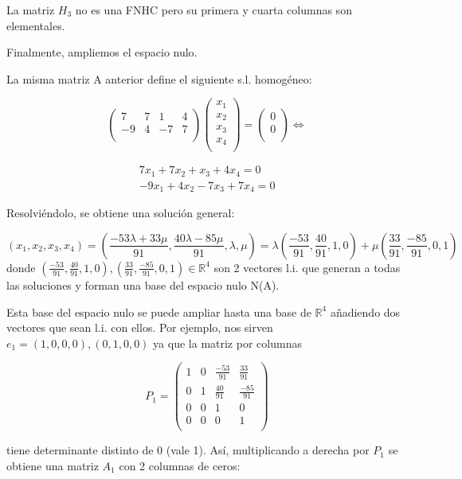 \documentclass[11pt, a4paper]{article}
\newif\IfInSansMode
\newcommand{\R}{\mathbb{R}} \newcommand{\N}{\mathbb{N}}
\theoremstyle{theorem-style}
\theoremstyle{definition-style}
\theoremstyle{remark-style}
\theoremstyle{example-style}
\begin{document}
La matriz $H_3$ no es una FNHC pero su primera y cuarta columnas son elementales.

Finalmente, ampliemos el espacio nulo.

La misma matriz A anterior define el siguiente s.l. homogéneo:

$$ \begin{pmatrix}
7 & 7 & 1 & 4 \\
-9 & 4 & -7 & 7 \\
\end{pmatrix}\begin{pmatrix}
x_1 \\
x_2 \\
x_3 \\
x_4 \\
\end{pmatrix}=
\begin{pmatrix}
0 \\
0 \\
\end{pmatrix} \Leftrightarrow $$

$$\begin{array}{c} 7x_1+7x_2+x_3+4x_4=0 \\ -9x_1+4x_2-7x_3+7x_4=0 \end{array} $$ 

Resolviéndolo, se obtiene una solución general:

$$(x_1,x_2,x_3,x_4) = (\frac{-53\lambda+33\mu}{91},\frac{40\lambda-85\mu}{91},\lambda,\mu) = \lambda(\frac{-53}{91},\frac{40}{91},1,0)+\mu(\frac{33}{91},\frac{-85}{91},0,1)$$
 donde $(\frac{-53}{91},\frac{40}{91},1,0),(\frac{33}{91},\frac{-85}{91},0,1) \in \R^4$ son 2 vectores l.i. que generan a todas las soluciones y forman una base del espacio nulo N(A).

Esta base del espacio nulo se puede ampliar hasta una base de $\R^4$ añadiendo dos vectores que sean l.i. con ellos. Por ejemplo, nos sirven $e_1=(1,0,0,0),(0,1,0,0)$ ya que la matriz por columnas

$$P_1 = \begin{pmatrix}
1 & 0 & \frac{-53}{91} & \frac{33}{91} \\
0 & 1 & \frac{40}{91} & \frac{-85}{91} \\
0 & 0 & 1 & 0 \\
0 & 0 & 0 & 1 \\
\end{pmatrix}$$

tiene determinante distinto de 0 (vale 1). Así, multiplicando a derecha por $P_1$ se obtiene una matriz $A_1$ con 2 columnas de ceros:
\end{document}
